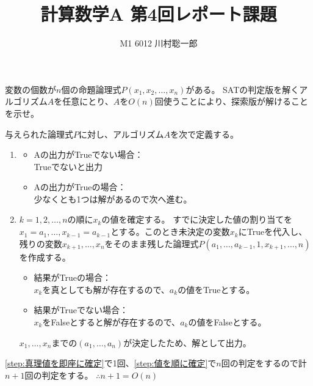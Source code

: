 \documentclass[dvipdfmx]{jsreport}
\title{計算数学A 第4回レポート課題}
\author{M1 6012 川村聡一郎}
\date{}
\begin{document}
\maketitle
\begin{tcolorbox}
	変数の個数が$n$個の命題論理式$P(x_1, x_2, \ldots, x_n)$がある。
	SATの判定版を解くアルゴリズム$A$を任意にとり、$A$を$O(n)$回使うことにより、探索版が解けることを示せ。
\end{tcolorbox}

\begin{souanswer} %
	与えられた論理式$P$に対し、アルゴリズム$A$を次で定義する。
\begin{enumerate}
	\item \label{step:真理値を即座に確定}
\begin{itemize}
	\item Aの出力がTrueでない場合：\\
	Trueでないと出力
	\item Aの出力がTrueの場合：\\
	少なくとも1つは解があるので次へ進む。
\end{itemize}
	\item \label{step:値を順に確定}$k= 1, 2, \ldots, n$の順に$x_k$の値を確定する。
	すでに決定した値の割り当てを$x_1= a_1, \ldots, x_{k- 1}= a_{k- 1}$とする。このとき未決定の変数$x_k$にTrueを代入し、残りの変数$x_{k+ 1}, \ldots, x_n$をそのまま残した論理式$P(a_1, \ldots, a_{k- 1}, 1, x_{k+ 1}, \ldots, n)$を作成する。
\begin{itemize}
	\item 結果がTrueの場合：\\
	$x_k$を真としても解が存在するので、$a_k$の値をTrueとする。
	\item 結果がTrueでない場合：\\
	$x_k$をFalseとすると解が存在するので、$a_k$の値をFalseとする。
\end{itemize}
	$x_1, \ldots, x_n$までの$(a_1, \ldots, a_n)$が決定したため、解として出力。
\end{enumerate}
	\ref{step:真理値を即座に確定}で1回、\ref{step:値を順に確定}で$n$回の判定をするので計$n+ 1$回の判定をする。
	$\therefore n+ 1= O(n)$
\end{souanswer}
\end{document}
